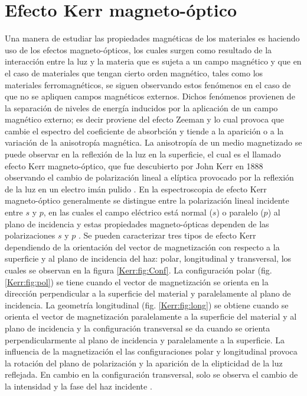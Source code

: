\documentclass[paper=letter, fontsize=12pt]{scrartcl}
\numberwithin{equation}{section}		%
\numberwithin{figure}{section}			%
\numberwithin{table}{section}				%
\begin{document}
	\section{Efecto Kerr magneto-\'optico}
	Una manera de estudiar las propiedades magn\'eticas de los materiales es haciendo uso de los efectos magneto-\'opticos, los cuales surgen como resultado de la interacci\'on entre la luz y la materia que es sujeta a un campo magn\'etico y que en el caso de materiales que tengan cierto orden magn\'etico, tales como los materiales ferromagn\'eticos, se siguen observando estos fen\'omenos en el caso de que no se apliquen campos magn\'eticos externos. Dichos fen\'omenos provienen de la separaci\'on de niveles de energ\'ia inducidos por la aplicaci\'on de un campo magn\'etico externo; es decir proviene del efecto Zeeman y lo cual provoca que cambie el espectro del coeficiente de  absorbci\'on y tiende a la aparici\'on o a la variaci\'on de la anisotropía magn\'etica. La anisotrop\'ia de un medio magnetizado se puede observar en la reflexi\'on de la luz en la superficie, el cual es el llamado efecto Kerr magneto-\'optico, que fue descubierto por  John Kerr en 1888 observando el cambio de polarizaci\'on  lineal a el\'iptica provocado por la reflexi\'on de la luz en un electro im\'an pulido \cite{Kerr_1888}.  En la espectroscopia de efecto Kerr magneto-\'optico generalmente se distingue entre la polarizaci\'on lineal incidente entre $s$ y $p$, en las cuales el campo el\'ectrico est\'a normal ($s$) o paralelo ($p$) al plano de incidencia y estas propiedades magneto-\'opticas dependen de las polarizaciones $s$ y $p$  \cite{mo_2004}. Se pueden caracterizar tres tipos de  efecto Kerr dependiendo de la orientaci\'on del vector de magnetizaci\'on con respecto a la superficie y al plano de incidencia del haz: polar, longitudinal y transversal, los cuales se observan en la figura \ref{Kerr:fig:Conf}. La configuraci\'on polar (fig. \ref{Kerr:fig:pol}) se tiene cuando el vector de magnetizaci\'on se orienta en la direcci\'on perpendicular a la superficie del material y paralelamente al plano de incidencia. La geometr\'ia longitudinal (fig. \ref{Kerr:fig:long}) se obtiene cuando se orienta el vector de magnetizaci\'on paralelamente a la superficie del material y al plano de incidencia y la configuraci\'on transversal se da cuando se orienta perpendicularmente al plano de incidencia y  paralelamente a la superficie.  La influencia de la magnetizaci\'on el las configuraciones polar  y longitudinal provoca la rotaci\'on del plano de polarizaci\'on y la aparici\'on de  la elipticidad de la luz reflejada. En cambio en la configuraci\'on transversal, solo se observa el cambio de la intensidad y la fase del haz incidente \cite{mo_2004}.
\end{document}
